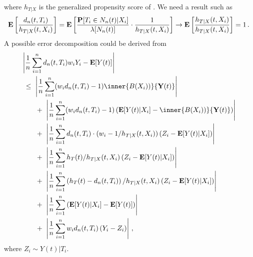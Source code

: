 where 
$
        h_{T|X}
        $ is the generalized propensity score of \cite{Hirano2005}. 
        We need a result such as
  \begin{align*}
    \mathbf{E}
    \left[ 
      \frac{
        d_n(t,T_i)
      }{
        h_{T|X}(t,X_i)
      }
    \right]
    =
    \mathbf{E}
    \left[ 
      \frac{
        \mathbf{P}
        [ T_i \in N_n(t) | X_i]
      }
      {
        \mathbf{\lambda}[N_n(t)]
      }
      \cdot
      \frac{1}
      {
        h_{T|X}(t,X_i)
      }
    \right]
    \to
    \mathbf{E}
    \left[ 
      \frac
      {
        h_{T|X}(t,X_i)
      }
      {
        h_{T|X}(t,X_i)
      }
    \right]
    =1
    \,.
  \end{align*}
  A possible error decomposition could be derived from
\begin{align*}
  &\left| 
  \frac{1}{n}
  \sum_{i=1}^{n} 
  d_n(t,T_i)
  w_i
  Y_i
  -
  \E[Y(t)]
  \right|
  \\
  &
  \ 
  \le
  \ 
  \left|  
  \frac{1}{n}
    \sum_{i=1}^{n} 
    (
    w_i 
  d_n(t,T_i)
    -
    1
    )
    \inner
    {B(X_i))}
    { \mathbf{Y}(t) }
  \right|
  \\
  &
  \qquad
  +
  \ 
  \left|  
  \frac{1}{n}
    \sum_{i=1}^{n} 
    (
    w_i 
  d_n(t,T_i)
    -
    1
    )
    \left( 
    \E[Y(t)| X_i]
    -
    \inner
    {B(X_i))}
    { \mathbf{Y}(t) }
    \right)
  \right|
  \\
  &
  \qquad
  +
  \ 
  \left|  
  \frac{1}{n}
    \sum_{i=1}^{n} 
  d_n(t,T_i)
    \cdot
    (
    w_i 
    -
    1/
h_{T|X}(t,X_i)
    )
    \left( 
      Z_i
    -
    \E[Y(t)| X_i]
    \right)
  \right|
  \\
  &
  \qquad
  +
  \ 
  \left|  
  \frac{1}{n}
    \sum_{i=1}^{n} 
h_{T}(t)
    /
h_{T|X}(t,X_i)
    \left( 
      Z_i
    -
    \E[Y(t)| X_i]
    \right)
  \right|
  \\
  &
  \qquad
  +
  \ 
  \left|  
  \frac{1}{n}
    \sum_{i=1}^{n} 
    \left( 
h_{T}(t)
-
  d_n(t,T_i)
    \right)
    /
h_{T|X}(t,X_i)
    \left( 
      Z_i
    -
    \E[Y(t)| X_i]
    \right)
  \right|
  \\
  &
  \qquad
  +
  \ 
  \left|  
  \frac{1}{n}
    \sum_{i=1}^{n} 
    \left( 
    \E[Y(t)| X_i]
    -
    \E[Y(t)]
    \right)
  \right|
  \\
  &
  \qquad
  +
  \ 
  \left|  
  \frac{1}{n}
    \sum_{i=1}^{n} 
    w_i 
d_n(t,T_i)
    \left( 
      Y_i
    -
    Z_i
    \right)
  \right|
  \,,
\end{align*}
where $ Z_i \sim Y(t)|T_i $.

